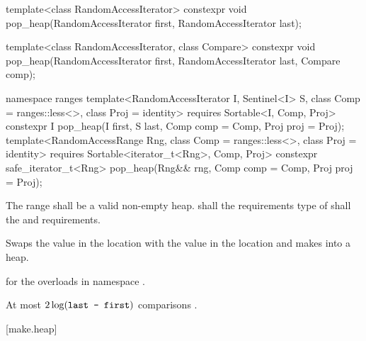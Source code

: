 %
\begin{itemdecl}
template<class RandomAccessIterator>
  constexpr void pop_heap(RandomAccessIterator first, RandomAccessIterator last);

template<class RandomAccessIterator, class Compare>
  constexpr void pop_heap(RandomAccessIterator first, RandomAccessIterator last,
                          Compare comp);
\end{itemdecl}
\begin{addedblock}
\begin{itemdecl}
namespace ranges {
  template<RandomAccessIterator I, Sentinel<I> S, class Comp = ranges::less<>,
      class Proj = identity>
    requires Sortable<I, Comp, Proj>
    constexpr I
      pop_heap(I first, S last, Comp comp = Comp{}, Proj proj = Proj{});
  template<RandomAccessRange Rng, class Comp = ranges::less<>, class Proj = identity>
    requires Sortable<iterator_t<Rng>, Comp, Proj>
    constexpr safe_iterator_t<Rng>
      pop_heap(Rng&& rng, Comp comp = Comp{}, Proj proj = Proj{});
}
\end{itemdecl}
\end{addedblock}

\begin{itemdescr}
\pnum
\requires
The range
shall be a valid non-empty heap.
 shall  the
 requirements  type
of  shall  the
 and
 requirements.

\pnum
\effects
Swaps the value in the location 
with the value in the location
and makes
into a heap.

\begin{addedblock}
\pnum
\returns
{} for the overloads in namespace .
\end{addedblock}

\pnum
\complexity
At most
$2 \log(\texttt{last - first})$
comparisons .
\end{itemdescr}


[make.heap]{}

